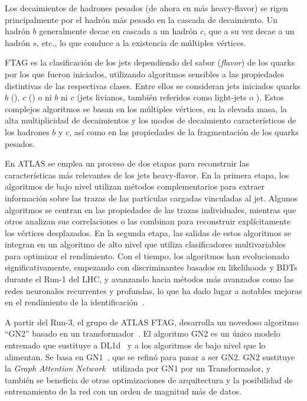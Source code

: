 Los decaimientos de hadrones pesados (de ahora en más heavy-flavor) se rigen principalmente por el hadrón más pesado en la cascada de decaimiento. Un hadrón \(b\) generalmente decae en cascada a un hadrón \(c\), que a su vez decae a un hadrón \(s\), etc., lo que conduce a la existencia de múltiples vértices.

\ac{FTAG} es la clasificación de los jets dependiendo del sabor (\textit{flavor}) de los quarks por los que fueron iniciados, utilizando algoritmos sensibles a las propiedades distintivas de las respectivas clases. Entre ellos se consideran jets iniciados quarks \(b\) (\bjets), \(c\) (\cjets) o ni \(b\) ni \(c\) (jets livianos, también referidos como light-jets o \ljets).
Estos complejos algoritmos se basan en los múltiples vértices, en la elevada masa, la alta multiplicidad de decaimientos y los modos de decaimiento característicos de los hadrones \(b\) y \(c\), así como en las propiedades de la fragmentación de los quarks pesados.


En \ac{ATLAS} se emplea un proceso de dos etapas para reconstruir las características más relevantes de los jets heavy-flavor. En la primera etapa, los algoritmos de bajo nivel utilizan métodos complementarios para extraer información sobre las trazas de las partículas cargadas vinculadas al jet. Algunos algoritmos se centran en las propiedades de las trazas individuales, mientras que otros analizan sus correlaciones o las combinan para reconstruir explícitamente los vértices desplazados. En la segunda etapa, las salidas de estos algoritmos se integran en un algoritmo de alto nivel que utiliza clasificadores multivariables para optimizar el rendimiento. Con el tiempo, los algoritmos han evolucionado significativamente, empezando con discriminantes basados en likelihoods y \acp{BDT} durante el Run-1 del \ac{LHC}, y avanzando hacia métodos más avanzados como las redes neuronales recurrentes y profundas, lo que ha dado lugar a notables mejoras en el rendimiento de la identificación~\cite{ATLAS-FTAG-Calibration-2012,ATLAS-FTAG-Efficiency-2012,MV2Algorithm,ATLAS-FTAG-DeepLearning}.

A partir del Run-3, el grupo de \ac{ATLAS} \ac{FTAG}, desarrolla un novedoso algoritmo \enquote{GN2} basado en un transformador~\cite{GN2Transformer}. El algoritmo GN2 es un único modelo entrenado que sustituye a DL1d~\cite{ATLAS-FTAG-DL1-Run2} y a los algoritmos de bajo nivel que lo alimentan. Se basa en GN1~\cite{ATLAS-FTAG-GN1}, que se refinó para pasar a ser GN2. GN2 sustituye la \textit{Graph Attention Network}~\cite{GANs} utilizada por GN1 por un Transformador, y también se beneficia de otras optimizaciones de arquitectura y la posibilidad de entrenamiento de la red con un orden de magnitud más de datos.

